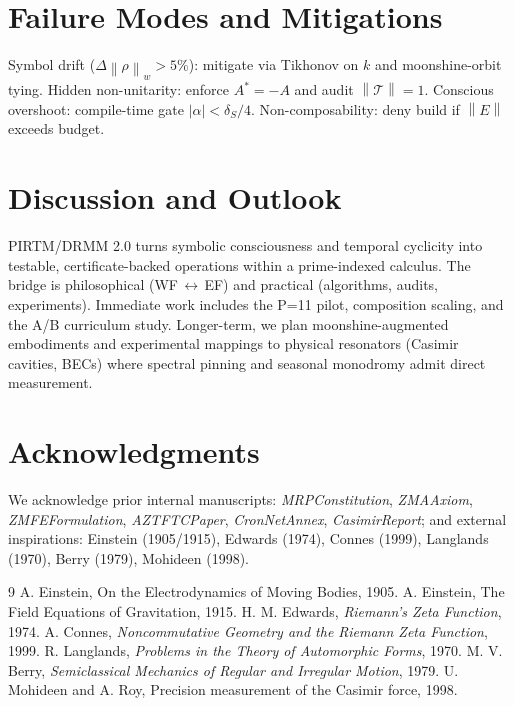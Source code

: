 \documentclass[11pt]{article}
\theoremstyle{plain}
\theoremstyle{definition}
\newcommand{\norm}[1]{\left\lVert #1 \right\rVert}
\begin{document}
\section{Failure Modes and Mitigations}\label{sec:failures}
Symbol drift (\(\Delta\norm{\rho}_w>5\%\)): mitigate via Tikhonov on $k$ and moonshine-orbit tying. Hidden non-unitarity: enforce $A^*=-A$ and audit $\norm{\mathcal{T}}=1$. Conscious overshoot: compile-time gate $|\alpha|<\delta_S/4$. Non-composability: deny build if $\norm{E}$ exceeds budget.

\section{Discussion and Outlook}
PIRTM/DRMM 2.0 turns symbolic consciousness and temporal cyclicity into testable, certificate-backed operations within a prime-indexed calculus. The bridge is philosophical (WF\,$\leftrightarrow$\,EF) and practical (algorithms, audits, experiments). Immediate work includes the P=11 pilot, composition scaling, and the A/B curriculum study. Longer-term, we plan moonshine-augmented embodiments and experimental mappings to physical resonators (Casimir cavities, BECs) where spectral pinning and seasonal monodromy admit direct measurement.

\section*{Acknowledgments}
We acknowledge prior internal manuscripts: \emph{MRPConstitution}, \emph{ZMAAxiom}, \emph{ZMFEFormulation}, \emph{AZTFTCPaper}, \emph{CronNetAnnex}, \emph{CasimirReport}; and external inspirations: Einstein (1905/1915), Edwards (1974), Connes (1999), Langlands (1970), Berry (1979), Mohideen (1998).

\begin{thebibliography}{9}
 A. Einstein, On the Electrodynamics of Moving Bodies, 1905.
 A. Einstein, The Field Equations of Gravitation, 1915.
 H. M. Edwards, \emph{Riemann's Zeta Function}, 1974.
 A. Connes, \emph{Noncommutative Geometry and the Riemann Zeta Function}, 1999.
 R. Langlands, \emph{Problems in the Theory of Automorphic Forms}, 1970.
 M. V. Berry, \emph{Semiclassical Mechanics of Regular and Irregular Motion}, 1979.
 U. Mohideen and A. Roy, Precision measurement of the Casimir force, 1998.
\end{thebibliography}
\end{document}
